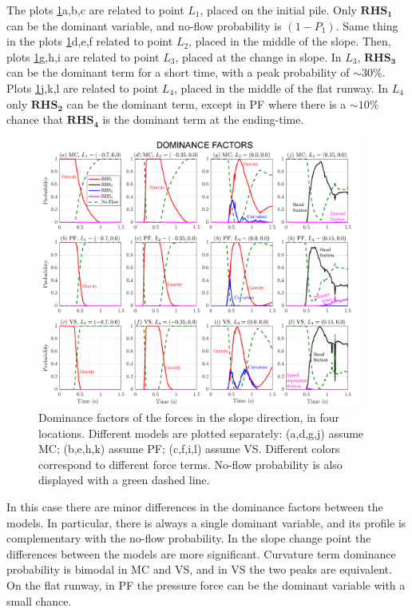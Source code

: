 \documentclass{article}
\begin{document}
The plots \ref{fig:Ramp-Pr_x}a,b,c are related to point $L_1$, placed on the initial pile. Only $\boldsymbol{RHS_1}$ can be the dominant variable, and no-flow probability is $(1-P_1)$. Same thing in the plots \ref{fig:Ramp-Pr_x}d,e,f related to point $L_2$, placed in the middle of the slope. Then, plots \ref{fig:Ramp-Pr_x}g,h,i are related to point $L_3$, placed at the change in slope. In $L_3$, $\boldsymbol{RHS_3}$ can be the dominant term for a short time, with a peak probability of $\sim 30\%$. Plots \ref{fig:Ramp-Pr_x}j,k,l are related to point $L_4$, placed in the middle of the flat runway. In $L_4$ only $\boldsymbol{RHS_2}$ can be the dominant term, except in PF where there is a $\sim 10\%$ chance that $\boldsymbol{RHS_4}$ is the dominant term at the ending-time.
\begin{figure}[H]
         \centering
        \includegraphics[width=0.95\textwidth]{figures/incline/Pr_x.png}
        \caption{Dominance factors of the forces in the slope direction, in four locations. Different models are plotted separately: (a,d,g,j) assume MC; (b,e,h,k) assume PF; (c,f,i,l) assume VS. Different colors correspond to different force terms. No-flow probability is also displayed with a green dashed line.}
        \label{fig:Ramp-Pr_x}
\end{figure}
In this case there are minor differences in the dominance factors between the models. In particular, there is always a single dominant variable, and its profile is complementary with the no-flow probability. In the slope change point the differences between the models are more significant. Curvature term dominance probability is bimodal in MC and VS, and in VS the two peaks are equivalent. On the flat runway, in PF the pressure force can be the dominant variable with a small chance.
\end{document}
